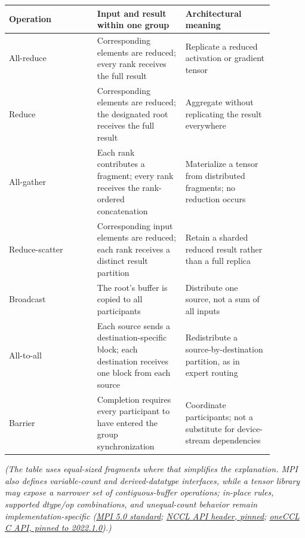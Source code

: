 \nopagebreak[4]
\begin{longtable}[]{@{}
  >{\raggedright\arraybackslash}p{0.2927\linewidth}
  >{\raggedright\arraybackslash}p{0.2927\linewidth}
  >{\raggedright\arraybackslash}p{0.2927\linewidth}@{}}
\toprule\noalign{}
\begin{minipage}[b]{\linewidth}\raggedright
Operation
\end{minipage} & \begin{minipage}[b]{\linewidth}\raggedright
Input and result within one group
\end{minipage} & \begin{minipage}[b]{\linewidth}\raggedright
Architectural meaning
\end{minipage} \\
\midrule\noalign{}
\endhead
\bottomrule\noalign{}
\endlastfoot
All-reduce & Corresponding elements are reduced; every rank receives the
full result & Replicate a reduced activation or gradient tensor \\
\noalign{\label{tab:9.2}}
Reduce & Corresponding elements are reduced; the designated root
receives the full result & Aggregate without replicating the result
everywhere \\
All-gather & Each rank contributes a fragment; every rank receives the
rank-ordered concatenation & Materialize a tensor from distributed
fragments; no reduction occurs \\
Reduce-scatter & Corresponding input elements are reduced; each rank
receives a distinct result partition & Retain a sharded reduced result
rather than a full replica \\
Broadcast & The root's buffer is copied to all participants & Distribute
one source, not a sum of all inputs \\
All-to-all & Each source sends a destination-specific block; each
destination receives one block from each source & Redistribute a
source-by-destination partition, as in expert routing \\
Barrier & Completion requires every participant to have entered the
group synchronization & Coordinate participants; not a substitute for
device-stream dependencies \\
\end{longtable}

\emph{(The table uses equal-sized fragments where that simplifies the
explanation. MPI also defines variable-count and derived-datatype
interfaces, while a tensor library may expose a narrower set of
contiguous-buffer operations; in-place rules, supported dtype/op
combinations, and unequal-count behavior remain implementation-specific
(\href{https://www.mpi-forum.org/docs/mpi-5.0/mpi50-report.pdf}{MPI 5.0
standard};
\href{https://raw.githubusercontent.com/NVIDIA/nccl/v2.32.3-1/src/nccl.h.in}{NCCL
API header, pinned};
\href{https://raw.githubusercontent.com/uxlfoundation/oneCCL/2022.1.0/include/oneapi/ccl.h}{oneCCL
C API, pinned to 2022.1.0}).)}


